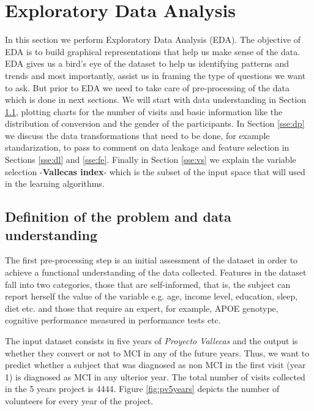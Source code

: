 \documentclass[11pt]{article}
\theoremstyle{definition}
\theoremstyle{remark}
\begin{document}
\section{Exploratory Data Analysis}
\label{se:eda}
In this section we perform Exploratory Data Analysis (EDA). The objective of EDA is to build graphical representations that help us make sense of the data. EDA gives us a bird's eye of the dataset to help us identifying patterns and trends and most importantly, assist us in framing the type of  questions we want to ask.
But prior to EDA we need to take care of pre-processing of the data which is done in next sections. 
We will start with data understanding in Section \ref{sse:biz}, plotting charts for the number of visits and basic information like the distribution of conversion and the gender of the participants. In Section \ref{sse:dp} we discuss the data transformations that need to be done, for example standarization, to pass to comment on data leakage and feature selection in Sections \ref{sse:dl} and \ref{sse:fe}. Finally in Section \ref{sse:vs} we explain the variable selection -\textbf{Vallecas index}- which is the subset of the input space that will used in the learning algorithms.


\subsection{Definition of the problem and data understanding}
\label{sse:biz}
The first pre-processing step is an initial assessment of the dataset in order to achieve a functional understanding of the data collected. Features in the dataset fall into two categories, those that are self-informed, that is, the subject can report herself the value of the variable e.g. age, income level, education, sleep, diet etc. and those that require an expert, for example, APOE genotype, cognitive performance measured in performance tests etc.

The input dataset consists in five years of \emph{Proyecto Vallecas} and the output is whether they convert or not to MCI in any of the future years. Thus, we want to predict whether a subject that was diagnosed as non MCI in the first visit (year 1) is diagnosed as MCI in any ulterior year. The total number of visits collected in the 5 years project is 4444. Figure \ref{fig:pv5years} depicts the number of volunteers for every year of the project.
\end{document}

